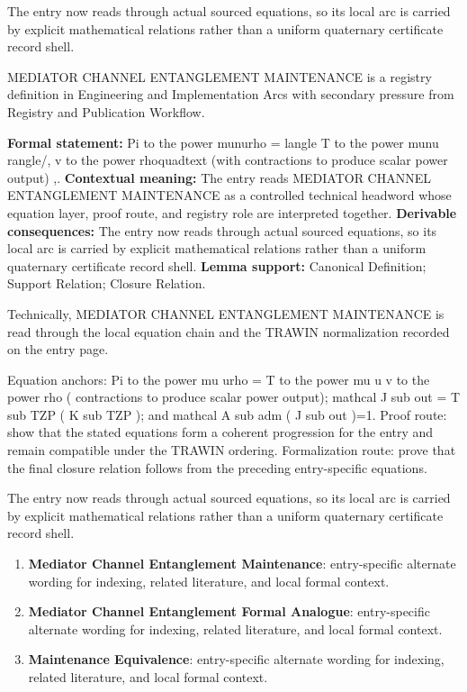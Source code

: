 The entry now reads through actual sourced equations, so its local arc is carried by explicit mathematical relations rather than a uniform quaternary certificate record shell.
\clearpage


\begingroup\small
{}
MEDIATOR CHANNEL ENTANGLEMENT MAINTENANCE is a registry definition in Engineering and Implementation Arcs with secondary pressure from Registry and Publication Workflow.

\begingroup\footnotesize\setlength{\emergencystretch}{3em}\sloppy
\textbf{Formal statement:} Pi to the power munurho = langle T to the power munu rangle/, v to the power rhoquadtext (with contractions to produce scalar power output) ,. \textbf{Contextual meaning:} The entry reads MEDIATOR CHANNEL ENTANGLEMENT MAINTENANCE as a controlled technical headword whose equation layer, proof route, and registry role are interpreted together. \textbf{Derivable consequences:} The entry now reads through actual sourced equations, so its local arc is carried by explicit mathematical relations rather than a uniform quaternary certificate record shell. \textbf{Lemma support:} Canonical Definition; Support Relation; Closure Relation.\par
\endgroup

Technically, MEDIATOR CHANNEL ENTANGLEMENT MAINTENANCE is read through the local equation chain and the TRAWIN normalization recorded on the entry page.

Equation anchors: Pi to the power mu urho = T to the power mu u v to the power rho ( contractions to produce scalar power output); mathcal J sub out = T sub TZP ( K sub TZP ); and mathcal A sub adm ( J sub out )=1. Proof route: show that the stated equations form a coherent progression for the entry and remain compatible under the TRAWIN ordering. Formalization route: prove that the final closure relation follows from the preceding entry-specific equations.

The entry now reads through actual sourced equations, so its local arc is carried by explicit mathematical relations rather than a uniform quaternary certificate record shell.
\endgroup

\begin{enumerate}[leftmargin=1.6em,itemsep=6pt,topsep=4pt]
\item \textbf{Mediator Channel Entanglement Maintenance}: entry-specific alternate wording for indexing, related literature, and local formal context.
\item \textbf{Mediator Channel Entanglement Formal Analogue}: entry-specific alternate wording for indexing, related literature, and local formal context.
\item \textbf{Maintenance Equivalence}: entry-specific alternate wording for indexing, related literature, and local formal context.
\end{enumerate}

